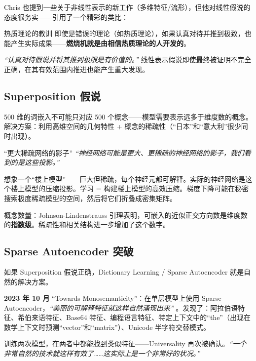 \documentclass[a4paper]{article}
\begin{document}
Chris 也提到一些关于非线性表示的新工作（多维特征/流形），但他对线性假说的态度很务实——引用了一个精彩的类比：

\begin{knowledgebox}{热质理论的教训}
即使是错误的理论（如热质理论），如果认真对待并推到极致，也能产生实际成果——\textbf{燃烧机就是由相信热质理论的人开发的}。

\textit{``认真对待假说并将其推到极限是有价值的。''} 线性表示假说即使最终被证明不完全正确，在其有效范围内推进也能产生重大发现。
\end{knowledgebox}

\subsection{Superposition 假说}

500 维的词嵌入不可能只对应 500 个概念——模型需要表示远多于维度数的概念。解决方案：利用高维空间的几何特性 + 概念的稀疏性（``日本''和``意大利''很少同时出现）。

\begin{importantbox}{``更大稀疏网络的影子''}
\textit{``神经网络可能是更大、更稀疏的神经网络的影子，我们看到的是这些投影。''}

想象一个``楼上模型''——巨大但稀疏，每个神经元都可解释。实际的神经网络是这个楼上模型的压缩投影。学习 = 构建楼上模型的高效压缩。梯度下降可能在秘密搜索极度稀疏模型的空间，然后将它们折叠成密集矩阵。

概念数量：Johnson-Lindenstrauss 引理表明，可嵌入的近似正交方向数是维度数的\textbf{指数级}。稀疏性和相关结构进一步增加了这个数字。
\end{importantbox}

\subsection{Sparse Autoencoder 突破}

如果 Superposition 假说正确，Dictionary Learning / Sparse Autoencoder 就是自然的解决方案。

\textbf{2023 年 10 月} ``Towards Monosemanticity''：在单层模型上使用 Sparse Autoencoder，\textit{``美丽的可解释特征就这样自然涌现出来''} 。发现了：阿拉伯语特征、希伯来语特征、Base64 特征、编程语言特征、特定上下文中的``the''（出现在数学上下文时预测``vector''和``matrix''）、Unicode 半字符交替模式。

训练两次模型，在两者中都能找到类似特征——Universality 再次被确认。\textit{``一个非常自然的技术就这样有效了……这实际上是一个非常好的状况。''}
\end{document}
